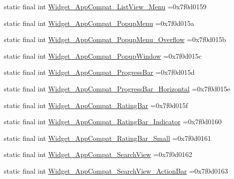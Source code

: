 \begin{DoxyCompactItemize}
\item 
static final int \mbox{\hyperlink{classcom_1_1example_1_1trainawearapplication_1_1_r_1_1style_a9cfb217c87a6a2f44c86ca63cb3dbe7a}{Widget\+\_\+\+App\+Compat\+\_\+\+List\+View\+\_\+\+Menu}} =0x7f0d0159
\item 
static final int \mbox{\hyperlink{classcom_1_1example_1_1trainawearapplication_1_1_r_1_1style_a2141e186cfc63d1fbe4ae0e5d2762960}{Widget\+\_\+\+App\+Compat\+\_\+\+Popup\+Menu}} =0x7f0d015a
\item 
static final int \mbox{\hyperlink{classcom_1_1example_1_1trainawearapplication_1_1_r_1_1style_a43d65970bcf8bb64fd5b79a35a78ee6b}{Widget\+\_\+\+App\+Compat\+\_\+\+Popup\+Menu\+\_\+\+Overflow}} =0x7f0d015b
\item 
static final int \mbox{\hyperlink{classcom_1_1example_1_1trainawearapplication_1_1_r_1_1style_a318f6ce1aed858bd16e2b10f2ec08385}{Widget\+\_\+\+App\+Compat\+\_\+\+Popup\+Window}} =0x7f0d015c
\item 
static final int \mbox{\hyperlink{classcom_1_1example_1_1trainawearapplication_1_1_r_1_1style_aa13d208ceb2ab1952d6156b17df43dad}{Widget\+\_\+\+App\+Compat\+\_\+\+Progress\+Bar}} =0x7f0d015d
\item 
static final int \mbox{\hyperlink{classcom_1_1example_1_1trainawearapplication_1_1_r_1_1style_adfe9da686b9d1b339346075953d663c1}{Widget\+\_\+\+App\+Compat\+\_\+\+Progress\+Bar\+\_\+\+Horizontal}} =0x7f0d015e
\item 
static final int \mbox{\hyperlink{classcom_1_1example_1_1trainawearapplication_1_1_r_1_1style_a3198501857067fb0608942820f963a70}{Widget\+\_\+\+App\+Compat\+\_\+\+Rating\+Bar}} =0x7f0d015f
\item 
static final int \mbox{\hyperlink{classcom_1_1example_1_1trainawearapplication_1_1_r_1_1style_a3df03f3f54e766c9f4e67934bae45a29}{Widget\+\_\+\+App\+Compat\+\_\+\+Rating\+Bar\+\_\+\+Indicator}} =0x7f0d0160
\item 
static final int \mbox{\hyperlink{classcom_1_1example_1_1trainawearapplication_1_1_r_1_1style_a5b2ddb1a6677bf1f8f5d82369db970ba}{Widget\+\_\+\+App\+Compat\+\_\+\+Rating\+Bar\+\_\+\+Small}} =0x7f0d0161
\item 
static final int \mbox{\hyperlink{classcom_1_1example_1_1trainawearapplication_1_1_r_1_1style_a49bfbd38c2081ef5f8220f08fd1b4843}{Widget\+\_\+\+App\+Compat\+\_\+\+Search\+View}} =0x7f0d0162
\item 
static final int \mbox{\hyperlink{classcom_1_1example_1_1trainawearapplication_1_1_r_1_1style_a1d625a209e9b5e47285befac4ee9499f}{Widget\+\_\+\+App\+Compat\+\_\+\+Search\+View\+\_\+\+Action\+Bar}} =0x7f0d0163

\end{DoxyCompactItemize}
